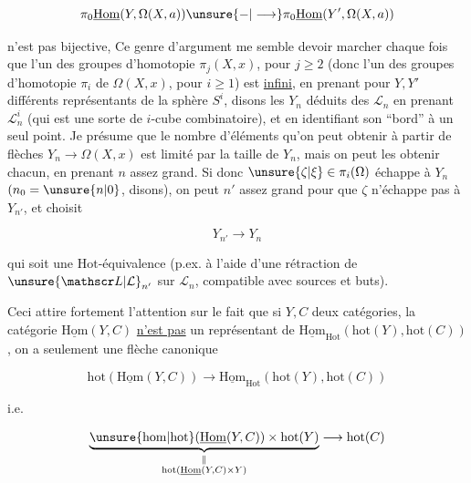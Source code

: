 \[
\pi_0\underline{\mathrm{Hom}}(Y,\Omega(X,a))\unsure{-|\longrightarrow}\pi_0\underline{\mathrm{Hom}}(Y',\Omega(X,a))
\]

n'est pas bijective, Ce genre d'argument me semble devoir marcher chaque fois que l'un des groupes d'homotopie  $\pi_j(X,x)$, pour $j\geq2$ (donc l'un des groupes d'homotopie $\pi_i$ de $\Omega(X,x)$, pour $i\geq1$) est \uline{infini}, en prenant pour $Y,Y'$  différents représentants  de la sphère $S^i$,  disons  les $Y_n$ déduits des  $\mathscr L_n$  en prenant $\mathscr L_n^i$  (qui est une sorte de $i$-cube combinatoire), et en identifiant son ``bord'' à un seul point. Je présume que le nombre d'éléments  qu'on peut obtenir à partir de  flèches $Y_n\longrightarrow\Omega(X,x)$ est limité par la taille de $Y_n$, mais on peut  les obtenir chacun, en prenant $n$ assez grand. Si donc $\unsure{\zeta|\xi}\in\pi_i(\Omega)$ échappe à $Y_n$ $(n_0=\unsure{n|0}$, disons), on peut  $n'$ assez grand pour que  $\zeta$ n'échappe pas à $Y_{n'}$, et  choisit

\[
Y_{n'}\longrightarrow Y_n
\]


qui soit une $\mathrm{Hot}$-équivalence (p.ex. à l'aide d'une rétraction de $\unsure{\mathscr L|\mathcal L}_{n'}$ sur $\mathscr L_n$,  compatible avec sources et buts).

Ceci attire fortement l'attention sur le fait que si $Y,C$  deux catégories, la catégorie $\underline{\mathrm{Hom}}(Y,C)$ \uline{n'est pas} un représentant de  $\underline{\mathrm{Hom}}_{\mathrm{Hot}}(\mathrm{hot}(Y),\mathrm{hot}(C))$, on a seulement une  flèche canonique

\[
\mathrm{hot}(\underline{\mathrm{Hom}}(Y,C))\longrightarrow \underline{\mathrm{Hom}}_{\mathrm{Hot}}(\mathrm{hot}(Y),\mathrm{hot}(C))
\tag*{(*)}
\]

i.e.

\[
\underbrace{\unsure{\mathrm{hom}|\mathrm{hot}}(\underline{\mathrm{Hom}}(Y,C))\times\mathrm{hot}(Y)}_{\substack{\Vert\\ \mathrm{hot}(\underline{\mathrm{Hom}}(Y,C)\times Y)}}\longrightarrow\mathrm{hot}(C)
\]

